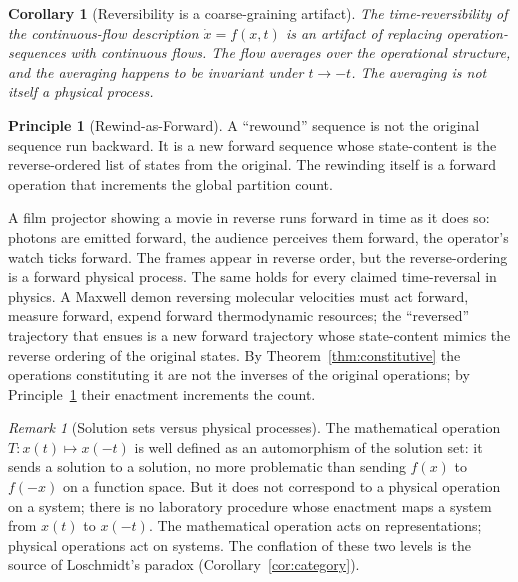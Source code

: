 \documentclass[11pt,a4paper]{article}
\theoremstyle{thmstyle}
\newtheorem{corollary}[theorem]{Corollary}
\theoremstyle{definition}
\newtheorem{principle}[theorem]{Principle}
\theoremstyle{remark}
\newtheorem{remark}[theorem]{Remark}
\begin{document}
\begin{corollary}[Reversibility is a coarse-graining artifact]
\label{cor:coarse}
The time-reversibility of the continuous-flow description
$\dot{x}=f(x,t)$ is an artifact of replacing operation-sequences with
continuous flows. The flow averages over the operational structure, and
the averaging happens to be invariant under $t\to-t$. The averaging is
not itself a physical process.
\end{corollary}

\begin{principle}[Rewind-as-Forward]
\label{prin:rewind}
A ``rewound'' sequence is not the original sequence run backward. It is a
new forward sequence whose state-content is the reverse-ordered list of
states from the original. The rewinding itself is a forward operation
that increments the global partition count.
\end{principle}

A film projector showing a movie in reverse runs forward in time as it
does so: photons are emitted forward, the audience perceives them
forward, the operator's watch ticks forward. The frames appear in reverse
order, but the reverse-ordering is a forward physical process. The same
holds for every claimed time-reversal in physics. A Maxwell demon
reversing molecular velocities must act forward, measure forward, expend
forward thermodynamic resources; the ``reversed'' trajectory that ensues
is a new forward trajectory whose state-content mimics the reverse
ordering of the original states. By Theorem~\ref{thm:constitutive} the
operations constituting it are not the inverses of the original
operations; by Principle~\ref{prin:rewind} their enactment increments the
count.

\begin{remark}[Solution sets versus physical processes]
\label{rem:levels}
The mathematical operation $T:x(t)\mapsto x(-t)$ is well defined as an
automorphism of the solution set: it sends a solution to a solution, no
more problematic than sending $f(x)$ to $f(-x)$ on a function space. But
it does not correspond to a physical operation on a system; there is no
laboratory procedure whose enactment maps a system from $x(t)$ to
$x(-t)$. The mathematical operation acts on representations; physical
operations act on systems. The conflation of these two levels is the
source of Loschmidt's paradox (Corollary~\ref{cor:category}).
\end{remark}

\end{document}
